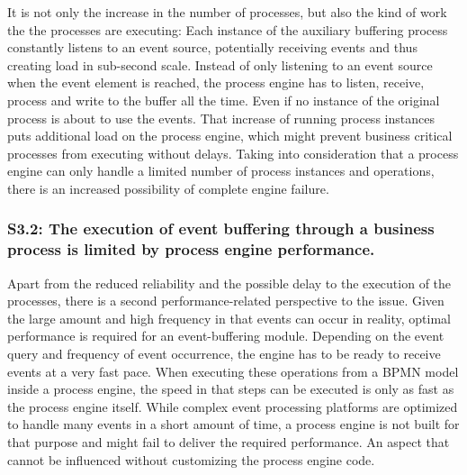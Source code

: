 It is not only the increase in the number of processes, but also the kind of work the the processes are executing: Each instance of the auxiliary buffering process constantly listens to an event source, potentially receiving events and thus creating load in sub-second scale.
Instead of only listening to an event source when the event element is reached, the process engine has to listen, receive, process and write to the buffer all the time. Even if no instance of the original process is about to use the events.
That increase of running process instances puts additional load on the process engine, which might prevent business critical processes from executing without delays. 
Taking into consideration that a process engine can only handle a limited number of process instances and operations, there is an increased possibility of complete engine failure.

\subsubsection*{S3.2: The execution of event buffering through a business process is limited by process engine performance.}
	
Apart from the reduced reliability and the possible delay to the execution of the processes, there is a second performance-related perspective to the issue.
Given the large amount and high frequency in that events can occur in reality, optimal performance is required for an event-buffering module. 
Depending on the event query and frequency of event occurrence, the engine has to be ready to receive events at a very fast pace.
When executing these operations from a BPMN model inside a process engine, the speed in that steps can be executed is only as fast as the process engine itself. While complex event processing platforms are optimized to handle many events in a short amount of time, a process engine is not built for that purpose and might fail to deliver the required performance.
An aspect that cannot be influenced without customizing the process engine code.




